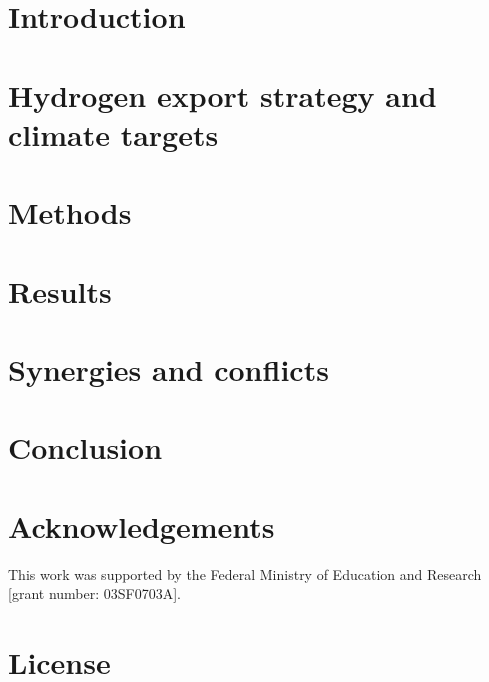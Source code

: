 \documentclass[5p]{elsarticle}
\begin{document}


\section{Introduction}
\label{sec:intro}



\section{Hydrogen export strategy and climate targets}
\label{subsec:policyandtargets}



\section{Methods}
\label{sec:methods}



\section{Results}
\label{sec:results}



\section{Synergies and conflicts}
\label{sec:discussion}



\section{Conclusion}
\label{sec:conclusion}



\section*{Acknowledgements}
This work was supported by the Federal Ministry of Education
and Research [grant number: 03SF0703A].


\section*{License}
\end{document}
